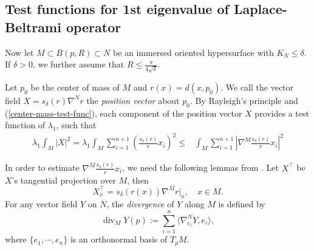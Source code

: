 \documentclass{amsart}
\numberwithin{equation}{section}
\theoremstyle{remark}
\renewcommand{\(}{\left(}
\renewcommand{\)}{\right)}
\renewcommand{\~}{\tilde}
\renewcommand{\-}{\overline}
\renewcommand{\d}{\delta}
\renewcommand{\l}{\lambda}
\newcommand{\divv}{\operatorname{div }}
\begin{document}
\subsection{Test functions for 1st eigenvalue of Laplace-Beltrami operator}
Now let $M\subset B(p,R)\subset N$ be an immersed oriented hypersurface with $K_N\le \d$. If $\d>0$, we further assume that $R\le \frac{\pi}{4\sqrt{\d}}$.

Let $p_0$ be the center of mass of $M$ and $r(x)=d(x,p_0)$. We call the vector field $X=s_\d(r)\nabla^N r$ the {\em position vector} about $p_0$. By Rayleigh's principle and (\ref{center-mass-test-func}), each component of the position vector $X$ provides a test function of $\lambda_1$, such that
\begin{align}
\l_1 \int_M |X|^2=\l_1 \int_M \sum_{i=1}^{n+1}\left(\frac{s_\d(r)}{r} x_i\right)^2 \leq & \int_M \sum_{i=1}^{n+1}\left|\nabla^M \frac{s_\d(r)}{r} x_i\right|^2
\end{align}

In order to estimate $\nabla^M \frac{s_\d(r)}{r} x_i$, we need the following lemmas from \cite{Heintze1988}. Let $X^\top$ be $X$'s tangential projection over $M$, then
$$
X^\top_x=s_\d(r(x))\nabla^M r|_x, \quad x\in M.
$$
For any vector field $Y$ on $N$, the {\em divergence} of $Y$ along $M$ is defined by
$$
\divv_M Y(p):=\sum_{i=1}^{n}\langle \nabla^N_{e_i}Y,e_i\rangle,
$$
where $\{e_1,\cdots,e_n \}$ is an orthonormal basis of $T_p M$.
\end{document}
